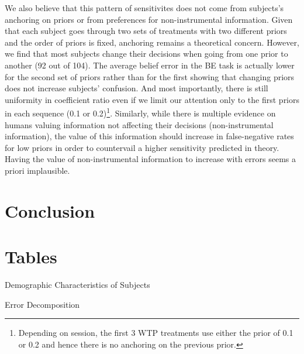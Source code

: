 \documentclass[12pt,a4paper]{article}
\begin{document}
We also believe that this pattern of sensitivites does not come from subjects's anchoring on priors or from preferences for non-instrumental information. Given that each subject goes through two sets of treatments with two different priors and the order of priors is fixed, anchoring remains a theoretical concern. However, we find that most subjects change their decisions when going from one prior to another (92 out of 104). The average belief error in the BE task is actually lower for the second set of priors rather than for the first showing that changing priors does not increase subjects' confusion. And most importantly, there is still uniformity in coefficient ratio even if we limit our attention only to the first priors in each sequence (0.1 or 0.2)\footnote{Depending on session, the first 3 WTP treatments use either the prior of 0.1 or 0.2 and hence there is no anchoring on the previous prior.}.  Similarly, while there is multiple evidence on humans valuing information not affecting their decisions (non-instrumental information), the value of this information should increase in false-negative rates for low priors in order to countervail a higher sensitivity predicted in theory. Having the value of non-instrumental information to increase with errors seems a priori implausible.





 

\vspace{20pt}

\section{Conclusion}


\clearpage





\appendix

\newpage
\section{Tables}


\begin{table}[h!]
\caption{Demographic Characteristics of Subjects} \label{summ_tab}

\end{table}

\begin{table}[h!]
\caption{Error Decomposition} \label{belief_decomposition}

\end{table}
\end{document}
